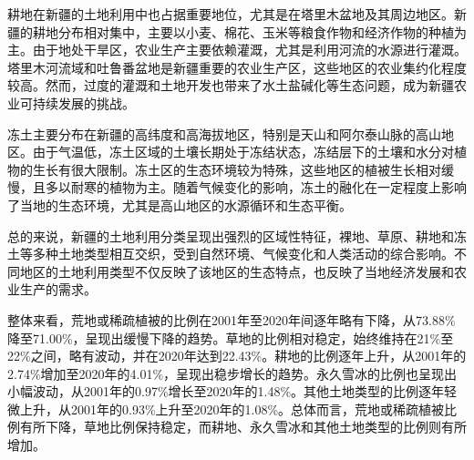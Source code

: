 \documentclass{article}
\begin{document}
		耕地在新疆的土地利用中也占据重要地位，尤其是在塔里木盆地及其周边地区。新疆的耕地分布相对集中，主要以小麦、棉花、玉米等粮食作物和经济作物的种植为主。由于地处干旱区，农业生产主要依赖灌溉，尤其是利用河流的水源进行灌溉。塔里木河流域和吐鲁番盆地是新疆重要的农业生产区，这些地区的农业集约化程度较高。然而，过度的灌溉和土地开发也带来了水土盐碱化等生态问题，成为新疆农业可持续发展的挑战。
		
		冻土主要分布在新疆的高纬度和高海拔地区，特别是天山和阿尔泰山脉的高山地区。由于气温低，冻土区域的土壤长期处于冻结状态，冻结层下的土壤和水分对植物的生长有很大限制。冻土区的生态环境较为特殊，这些地区的植被生长相对缓慢，且多以耐寒的植物为主。随着气候变化的影响，冻土的融化在一定程度上影响了当地的生态环境，尤其是高山地区的水源循环和生态平衡。
		
		总的来说，新疆的土地利用分类呈现出强烈的区域性特征，裸地、草原、耕地和冻土等多种土地类型相互交织，受到自然环境、气候变化和人类活动的综合影响。不同地区的土地利用类型不仅反映了该地区的生态特点，也反映了当地经济发展和农业生产的需求。
		
		整体来看，荒地或稀疏植被的比例在2001年至2020年间逐年略有下降，从73.88\%降至71.00\%，呈现出缓慢下降的趋势。草地的比例相对稳定，始终维持在21\%至22\%之间，略有波动，并在2020年达到22.43\%。耕地的比例逐年上升，从2001年的2.74\%增加至2020年的4.01\%，呈现出稳步增长的趋势。永久雪冰的比例也呈现出小幅波动，从2001年的0.97\%增长至2020年的1.48\%。其他土地类型的比例逐年轻微上升，从2001年的0.93\%上升至2020年的1.08\%。总体而言，荒地或稀疏植被比例有所下降，草地比例保持稳定，而耕地、永久雪冰和其他土地类型的比例则有所增加。
		
\end{document}
